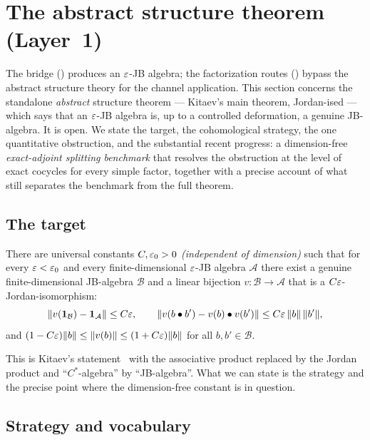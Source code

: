 \section{The abstract structure theorem (Layer~1)}\label{sec:programme}

The bridge () produces an $\varepsilon$-JB algebra; the factorization
routes () bypass the abstract structure
theory for the channel application. This section concerns the standalone
\emph{abstract} structure theorem --- Kitaev's main theorem, Jordan-ised --- which
says that an $\varepsilon$-JB algebra is, up to a controlled deformation, a genuine
JB-algebra. It is open. We state the target, the cohomological strategy, the one
quantitative obstruction, and the substantial recent progress: a dimension-free
\emph{exact-adjoint splitting benchmark} that resolves the obstruction at the
level of exact cocycles for every simple factor, together with a precise account
of what still separates the benchmark from the full theorem.

\subsection{The target}

\begin{openproblem}\label{op:jordan-structure}
There are universal constants $C,\varepsilon_{0}>0$ \emph{(independent of dimension)}
such that for every $\varepsilon<\varepsilon_{0}$ and every finite-dimensional $\varepsilon$-JB algebra
$\mathcal{A}$ there exist a genuine finite-dimensional JB-algebra $\mathcal{B}$
and a linear bijection $v\colon\mathcal{B}\to\mathcal{A}$ that is a
$C\varepsilon$-Jordan-isomorphism:
\[
   \lVert v(\mathbf{1}_{\mathcal{B}})-\mathbf{1}_{\mathcal{A}} \rVert\le C\varepsilon,\qquad
   \lVert v(b\bullet b')-v(b)\bullet v(b') \rVert\le C\varepsilon\,\lVert b \rVert\,\lVert b' \rVert,
\]
and $(1-C\varepsilon)\lVert b \rVert\le\lVert v(b) \rVert\le(1+C\varepsilon)\lVert b \rVert$ for all
$b,b'\in\mathcal{B}$.
\end{openproblem}

This is Kitaev's statement~\cite[Theorem \texttt{th\_main}]{Kitaev2024} with the
associative product replaced by the Jordan product and ``$C^{*}$-algebra'' by
``JB-algebra''. What we can state is the strategy and the precise point where the
dimension-free constant is in question.

\subsection{Strategy and vocabulary}

